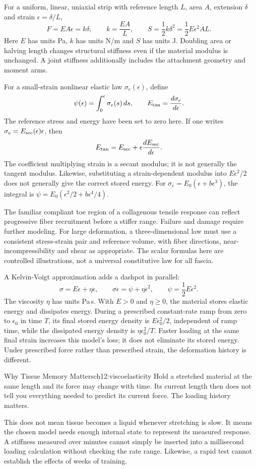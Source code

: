 For a uniform, linear, uniaxial strip with reference length $L$, area $A$, extension $\delta$ and strain $\epsilon=\delta/L$,
\[
F=EA\epsilon=k\delta,\qquad k=\frac{EA}{L},\qquad
S=\frac12 k\delta^2=\frac12 E\epsilon^2 AL.
\]
Here $E$ has units Pa, $k$ has units N/m and $S$ has units J. Doubling area or halving length changes structural stiffness even if the material modulus is unchanged. A joint stiffness additionally includes the attachment geometry and moment arms.

For a small-strain nonlinear elastic law $\sigma_e(\epsilon)$, define
\[
\psi(\epsilon)=\int_0^\epsilon\sigma_e(s)\,ds,
\qquad E_{\rm tan}=\frac{d\sigma_e}{d\epsilon}.
\]
The reference stress and energy have been set to zero here. If one writes $\sigma_e=E_{\rm sec}(\epsilon)\epsilon$, then
\[
E_{\rm tan}=E_{\rm sec}+\epsilon\frac{dE_{\rm sec}}{d\epsilon}.
\]
The coefficient multiplying strain is a secant modulus; it is not generally the tangent modulus. Likewise, substituting a strain-dependent modulus into $E\epsilon^2/2$ does not generally give the correct stored energy. For $\sigma_e=E_0(\epsilon+b\epsilon^3)$, the integral is $\psi=E_0(\epsilon^2/2+b\epsilon^4/4)$.

The familiar compliant toe region of a collagenous tensile response can reflect progressive fiber recruitment before a stiffer range. Failure and damage require further modeling. For large deformation, a three-dimensional law must use a consistent stress-strain pair and reference volume, with fiber directions, near-incompressibility and shear as appropriate. The scalar formulas here are controlled illustrations, not a universal constitutive law for all fascia.

A Kelvin-Voigt approximation adds a dashpot in parallel:
\[
\sigma=E\epsilon+\eta\dot\epsilon,
\qquad\sigma\dot\epsilon=\dot\psi+\eta\dot\epsilon^2,
\qquad\psi=\frac12 E\epsilon^2.
\]
The viscosity $\eta$ has units Pa\,s. With $E>0$ and $\eta\geq0$, the material stores elastic energy and dissipates energy. During a prescribed constant-rate ramp from zero to $\epsilon_0$ in time $T$, its final stored energy density is $E\epsilon_0^2/2$, independent of ramp time, while the dissipated energy density is $\eta\epsilon_0^2/T$. Faster loading at the same final strain increases this model's loss; it does not eliminate its stored energy. Under prescribed force rather than prescribed strain, the deformation history is different.

\begin{laymansbox}{Why Tissue Memory Matters}{ch12:viscoelasticity}
Hold a stretched material at the same length and its force may change with time. Its current length then does not tell you everything needed to predict its current force. The loading history matters.

This does not mean tissue becomes a liquid whenever stretching is slow. It means the chosen model needs enough internal state to represent its measured response. A stiffness measured over minutes cannot simply be inserted into a millisecond loading calculation without checking the rate range. Likewise, a rapid test cannot establish the effects of weeks of training.
\end{laymansbox}

